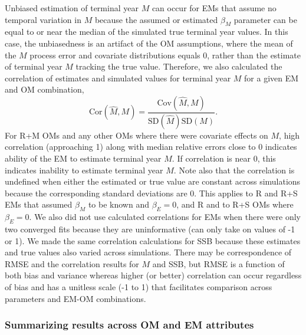 \documentclass[
  12pt,
]{article}
\begin{document}
Unbiased estimation of terminal year \(M\) can occur for EMs that assume
no temporal variation in \(M\) because the assumed or estimated
\(\beta_M\) parameter can be equal to or near the median of the
simulated true terminal year values. In this case, the unbiasedness is
an artifact of the OM assumptions, where the mean of the \(M\) process
error and covariate distributions equals 0, rather than the estimate of
terminal year \(M\) tracking the true value. Therefore, we also
calculated the correlation of estimates and simulated values for
terminal year \(M\) for a given EM and OM combination, \[
\text{Cor}\left(\widehat M, M\right) = \frac{\text{Cov}\left(\widehat M, M\right)}{\text{SD}\left(\widehat M\right)\text{SD}\left(M\right)}.
\] For R+M OMs and any other OMs where there were covariate effects on
\(M\), high correlation (approaching 1) along with median relative
errors close to 0 indicates ability of the EM to estimate terminal year
\(M\). If correlation is near 0, this indicates inability to estimate
terminal year \(M\). Note also that the correlation is undefined when
either the estimated or true value are constant across simulations
because the corresponding standard deviations are 0. This applies to R
and R+S EMs that assumed \(\beta_M\) to be known and \(\beta_E = 0\),
and R and to R+S OMs where \(\beta_E = 0\). We also did not use
calculated correlations for EMs when there were only two converged fits
because they are uninformative (can only take on values of -1 or 1). We
made the same correlation calculations for SSB because these estimates
and true values also varied across simulations. There may be
correspondence of RMSE and the correlation results for \(M\) and SSB,
but RMSE is a function of both bias and variance whereas higher (or
better) correlation can occur regardless of bias and has a unitless
scale (-1 to 1) that facilitates comparison across parameters and EM-OM
combinations.

\subsubsection*{Summarizing results across OM and EM
attributes}\label{summarizing-results-across-om-and-em-attributes}
\end{document}
